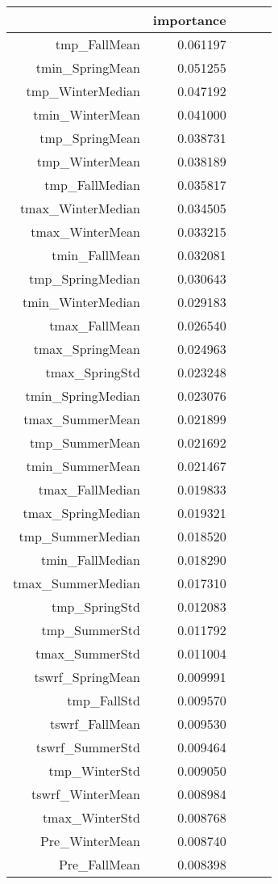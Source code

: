 \begin{tabular}{rrrrr}
\toprule
 & importance \\
\midrule
tmp_FallMean & 0.061197 \\
tmin_SpringMean & 0.051255 \\
tmp_WinterMedian & 0.047192 \\
tmin_WinterMean & 0.041000 \\
tmp_SpringMean & 0.038731 \\
tmp_WinterMean & 0.038189 \\
tmp_FallMedian & 0.035817 \\
tmax_WinterMedian & 0.034505 \\
tmax_WinterMean & 0.033215 \\
tmin_FallMean & 0.032081 \\
tmp_SpringMedian & 0.030643 \\
tmin_WinterMedian & 0.029183 \\
tmax_FallMean & 0.026540 \\
tmax_SpringMean & 0.024963 \\
tmax_SpringStd & 0.023248 \\
tmin_SpringMedian & 0.023076 \\
tmax_SummerMean & 0.021899 \\
tmp_SummerMean & 0.021692 \\
tmin_SummerMean & 0.021467 \\
tmax_FallMedian & 0.019833 \\
tmax_SpringMedian & 0.019321 \\
tmp_SummerMedian & 0.018520 \\
tmin_FallMedian & 0.018290 \\
tmax_SummerMedian & 0.017310 \\
tmp_SpringStd & 0.012083 \\
tmp_SummerStd & 0.011792 \\
tmax_SummerStd & 0.011004 \\
tswrf_SpringMean & 0.009991 \\
tmp_FallStd & 0.009570 \\
tswrf_FallMean & 0.009530 \\
tswrf_SummerStd & 0.009464 \\
tmp_WinterStd & 0.009050 \\
tswrf_WinterMean & 0.008984 \\
tmax_WinterStd & 0.008768 \\
Pre_WinterMean & 0.008740 \\
Pre_FallMean & 0.008398 \\

\end{tabular}
